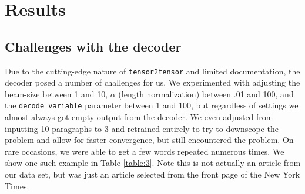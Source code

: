 \documentclass[11pt]{article}
\begin{document}
\section{Results}
\subsection{Challenges with the decoder}

Due to the cutting-edge nature of \texttt{tensor2tensor} and limited documentation, the decoder posed a number of challenges for us. We experimented with adjusting the beam-size between 1 and 10, $\alpha$ (length normalization) between .01 and 100, and the \texttt{decode\_variable} parameter between 1 and 100, but regardless of settings we almost always got empty output from the decoder. We even adjusted from inputting 10 paragraphs to 3 and retrained entirely to try to downscope the problem and allow for faster convergence, but still encountered the problem. On rare occasions, we were able to get a few words repeated numerous times. We show one such example in Table \ref{table:3}. Note this is not actually an article from our data set, but was just an article selected from the front page of the New York Times.
\end{document}

